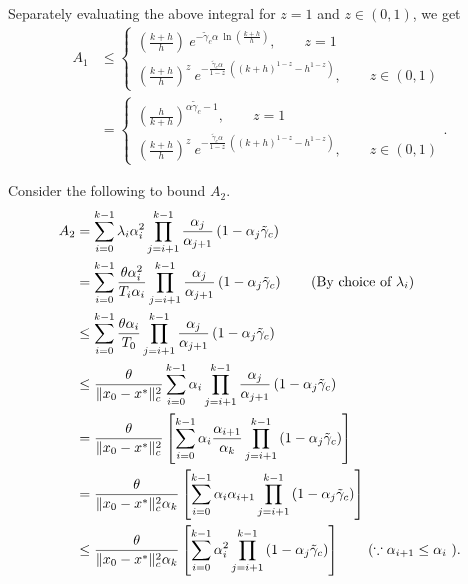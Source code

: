 \documentclass{article}
\newcommand{\lrp}[1]{\left( #1 \right)}
\newcommand{\lrs}[1]{\left[ #1 \right]}
\begin{document}
Separately evaluating the above integral for $z=1$ and $z \in (0,1)$, we get
\begin{align*}
    A_1 &\le 
    \begin{cases}
        \lrp{ \frac{k+h}{h} } ~ e^{-\tilde{\gamma}_c\alpha~ \ln\lrp{\frac{k+h}{h}} }, \qquad z = 1\\
        \lrp{ \frac{k+h}{h} }^z ~ e^{-\frac{\tilde{\gamma}_c\alpha}{1-z}~\lrp{(k+h)^{1-z} - h^{1-z}} }, \qquad z \in (0,1)
    \end{cases}\\
    &= \begin{cases}
        \lrp{ \frac{h}{k+h} }^{\alpha\tilde{\gamma}_c - 1}, \qquad z = 1\\
        \lrp{ \frac{k+h}{h} }^z ~ e^{-\frac{\tilde{\gamma}_c\alpha}{1-z}~\lrp{(k+h)^{1-z} - h^{1-z}} }, \qquad z \in (0,1)
    \end{cases}.
\end{align*}

Consider the following to bound $A_2$.
\begin{align*}
    A_2 &= \sum\limits_{i=0}^{k-1} \lambda_i \alpha^2_i \prod\limits_{j=i+1}^{k-1} \frac{\alpha_j}{\alpha_{j+1}}\lrp{1 - \alpha_j \tilde{\gamma}_c}\\
    &= \sum\limits_{i=0}^{k-1} \frac{\theta \alpha^2_i}{T_i \alpha_i}  \prod\limits_{j=i+1}^{k-1} \frac{\alpha_j}{\alpha_{j+1}}\lrp{1 - \alpha_j \tilde{\gamma}_c} \tag{By choice of $\lambda_i$}\\
    &\le \sum\limits_{i=0}^{k-1} \frac{\theta \alpha_i}{T_0 }  \prod\limits_{j=i+1}^{k-1} \frac{\alpha_j}{\alpha_{j+1}}\lrp{1 - \alpha_j \tilde{\gamma}_c} \\
    & \le \frac{\theta}{\|x_0-x^*\|^2_c }\sum\limits_{i=0}^{k-1} \alpha_i \prod\limits_{j=i+1}^{k-1} \frac{\alpha_j}{\alpha_{j+1}}\lrp{1 - \alpha_j \tilde{\gamma}_c}\\
    &= \frac{\theta}{\|x_0-x^*\|^2_c } \lrs{\sum\limits_{i=0}^{k-1} \alpha_i \frac{\alpha_{i+1}}{\alpha_k}\prod\limits_{j=i+1}^{k-1} \lrp{1 - \alpha_j \tilde{\gamma}_c}}\\
    &= \frac{\theta}{\|x_0-x^*\|^2_c  \alpha_k} \lrs{\sum\limits_{i=0}^{k-1} \alpha_i \alpha_{i+1} \prod\limits_{j=i+1}^{k-1} \lrp{1 - \alpha_j \tilde{\gamma}_c}}\\
    &\le \frac{\theta}{\|x_0-x^*\|^2_c  \alpha_k} \lrs{\sum\limits_{i=0}^{k-1} \alpha^2_i\prod\limits_{j=i+1}^{k-1} \lrp{1 - \alpha_j \tilde{\gamma}_c}} \tag{$\because \alpha_{i+1}\le \alpha_i $ }.
\end{align*}
\end{document}
